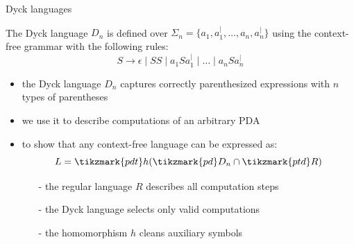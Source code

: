 \documentclass[handout]{beamer}
\begin{document}
\begin{frame}{Dyck languages}

    \begin{definition}
        The \alert{Dyck language} $D_n$ is defined over $\Sigma_n=\{a_1, a^|_1,\ldots,a_n, a^|_n\}$ using the context-free grammar with the following rules: 
        $$
        S\rightarrow \epsilon\mid SS\mid a_1Sa_1^| \mid \ldots \mid a_nSa_n^|
        $$
    \end{definition}  
    \vspace{-6pt}      
    \begin{itemize}
        \item the Dyck language $D_n$ captures correctly parenthesized expressions with $n$ types of parentheses
        \item we use it to describe computations of an arbitrary PDA
        \item to show that any context-free language can be expressed as:
        $$
        L = \tikzmark{pdt}h(\tikzmark{pd}D_n\cap \tikzmark{ptd}R)
        $$
        \vspace{-12pt}
        \begin{itemize}
            \item[-] the regular language $R$ describes all computation steps
            \item[-] the Dyck language selects only valid computations
            \item[-] the homomorphism $h$ cleans auxiliary symbols
        \end{itemize}
    \end{itemize}
    
\end{frame}
\end{document}
